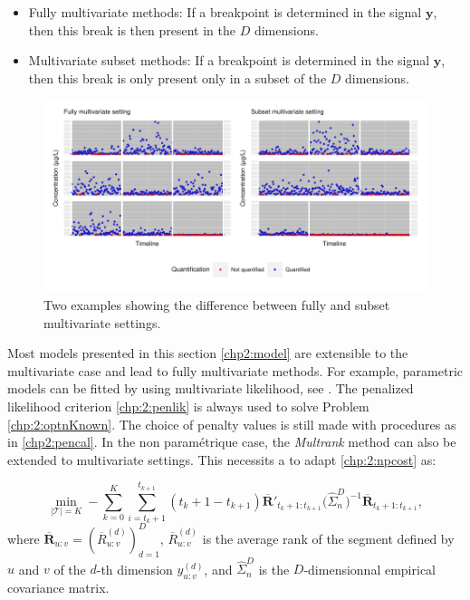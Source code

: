 \begin{itemize}
  \item Fully multivariate methods: If a breakpoint is determined in the signal $\bm y$, then this break is then present in the $D$ dimensions. 
  \item Multivariate subset methods: If a breakpoint is determined in the signal $\bm y$, then this break is only present only in a subset of the $D$ dimensions.
\end{itemize}

\begin{figure}[ht]
  \centering
  \includegraphics[]{figs/Chap2/MultiCP.pdf}
  \caption{Two examples showing the difference between fully and subset multivariate settings.}
  \label{fig:multicp}
\end{figure}

Most models presented in this section \ref{chp2:model} are extensible to the multivariate case and lead to fully multivariate methods. For example, parametric models can be fitted by using multivariate likelihood, see . The penalized likelihood criterion \ref{chp:2:penlik} is always used to solve Problem \ref{chp:2:optnKnown}. The choice of penalty values is still made with procedures as in \ref{chp2:pencal}. In the non paramétrique case, the \textit{Multrank} method can also be extended to multivariate settings. This necessits a to adapt \ref{chp:2:npcost} as:  

\begin{equation}\label{chp:2:npcostmulti}
\min_{\lvert\mathcal{T}\rvert = K}  -\sum_{k=0}^K \sum_{i = t_k+1}^{t_{k+1}} (t_k+1-t_{k+1})\overline{\bm R}'_{t_k+1:t_{k+1}}\bigg(\hat{\Sigma}_n^D\bigg)^{-1}\overline{\bm R}_{t_k+1:t_{k+1}},
\end{equation}       
where $\overline{\bm R}_{u:v} = (\overline{R}^{(d)}_{u:v})_{d=1}^D$, $\overline{R}^{(d)}_{u:v}$ is the average rank of the segment defined by $u$ and $v$ of the $d$-th dimension $y^{(d)}_{u:v}$, and $\hat{\Sigma}_n^D$ is the $D$-dimensionnal empirical covariance matrix. 

